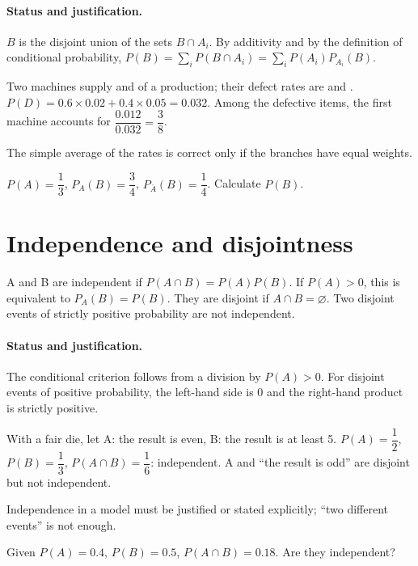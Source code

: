 \paragraph{Status and justification.} $B$ is the disjoint union of the sets $B\cap A_i$. By additivity and by the definition of conditional probability, $P(B)=\sum_iP(B\cap A_i)=\sum_iP(A_i)P_{A_i}(B)$.
\begin{example}Two machines supply  and  of a production; their defect rates are  and . $P(D)=\num{0,6}\times\num{0,02}+\num{0,4}\times\num{0,05}=\num{0,032}$. Among the defective items, the first machine accounts for $\dfrac{\num{0,012}}{\num{0,032}}=\dfrac{3}{8}$.\end{example}\label{C05-EX2}
\begin{pitfall}The simple average of the rates is correct only if the branches have equal weights.\end{pitfall}
\begin{application}$P(A)=\dfrac{1}{3}$, $P_A(B)=\dfrac{3}{4}$, $P_{\overline A}(B)=\dfrac{1}{4}$. Calculate $P(B)$.\end{application}\label{C05-AP2}
\section{Independence and disjointness}\label{C05-U3}
\begin{keypoint}
A and B are independent if $P(A\cap B)=P(A)P(B)$. If $P(A)>0$, this is equivalent to $P_A(B)=P(B)$. They are disjoint if $A\cap B=\varnothing$. Two disjoint events of strictly positive probability are not independent.
\end{keypoint}
\paragraph{Status and justification.} The conditional criterion follows from a division by $P(A)>0$. For disjoint events of positive probability, the left-hand side is 0 and the right-hand product is strictly positive.
\begin{example}With a fair die, let A: the result is even, B: the result is at least 5. $P(A)=\dfrac{1}{2}$, $P(B)=\dfrac{1}{3}$, $P(A\cap B)=\dfrac{1}{6}$: independent. A and ``the result is odd'' are disjoint but not independent.\end{example}\label{C05-EX3}
\begin{pitfall}Independence in a model must be justified or stated explicitly; ``two different events'' is not enough.\end{pitfall}
\begin{application}Given $P(A)=\num{0,4}$, $P(B)=\num{0,5}$, $P(A\cap B)=\num{0,18}$. Are they independent?\end{application}\label{C05-AP3}
